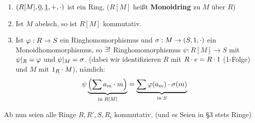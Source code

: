 \documentclass[a4paper]{report}
\begin{document}
\begin{ubng}\item
\begin{enumerate}[ a)]
  \item $(R[M], \underline 0, \underline 1, +, \cdot)$ ist ein Ring, ($R[M]$ heißt \textbf{Monoidring} zu $M$ über $R$)
  \item Ist $M$ abelsch, so ist $R[M]$  kommutativ.
  \item Ist $\varphi: R \to S$ ein Ringhomomorphismus und $\sigma : M \to (S, 1, \cdot)$ ein Monoidhomomorphismus, so $\exists !$ Ringhomomorphismus $\psi : R[M] \to S$ mit $\psi|_{R} = \varphi$ und $\psi|_{M} = \sigma$. (dabei wir identifizieren $R$ mit $R \cdot e = R \cdot 1$ (1-Folge) und $M$ mit $1_{R} \cdot M$), nämlich:
        \[\psi\underbrace{\left(\sum a_{m}\cdot m\right)}_{\text{in }R[M]} = \underbrace{\sum \varphi(a_{m})\cdot \sigma(m)}_{\text{in } S}\]
\end{enumerate}
\end{ubng}

\begin{kon*}
Ab nun seien alle Ringe $R, R', S, R_{i}$ kommutativ, (und es Seien in §3 stets Ringe)
\end{kon*}
\end{document}
